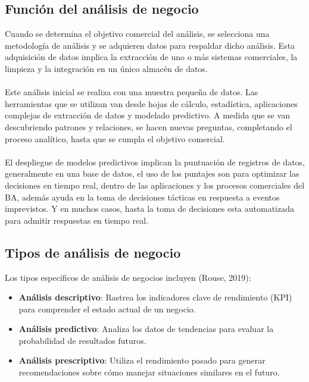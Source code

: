 \documentclass[twoside,twocolumn]{article}
\begin{document}
\subsection{Función del análisis de negocio}
Cuando se determina el objetivo comercial del análisis, se selecciona una metodología de análisis y se adquieren datos para respaldar dicho análisis.  Esta adquisición de datos implica la extracción de uno o más sistemas comerciales, la limpieza y la integración en un único almacén de datos.
\\ \\
Este análisis inicial se realiza con una muestra pequeña de datos.  Las herramientas que se utilizan van desde hojas de cálculo, estadística, aplicaciones complejas de extracción de datos y modelado predictivo. A medida que se van descubriendo patrones y relaciones, se hacen nuevas preguntas, completando el proceso analítico, hasta que se cumpla el objetivo comercial.
\\ \\
El despliegue de modelos predictivos implican la puntuación de registros de datos, generalmente en una base de datos, el uso de los puntajes son para optimizar las decisiones en tiempo real, dentro de las aplicaciones y los procesos comerciales del BA, además ayuda en la toma de decisiones tácticas en respuesta a eventos imprevistos.  Y en muchos casos, hasta la toma de decisiones esta automatizada para admitir respuestas en tiempo real.
\subsection{Tipos de análisis de negocio}
Los tipos específicos de análisis de negocios incluyen (Rouse, 2019):


\begin{itemize}	

	\item \textbf{Análisis descriptivo}: Rastrea los indicadores clave de rendimiento (KPI) para comprender el estado actual de un negocio.
	\item \textbf{Análisis predictivo}: Analiza los datos de tendencias para evaluar la probabilidad de resultados futuros.
	\item \textbf{Análisis prescriptivo}: Utiliza el rendimiento pasado para generar recomendaciones sobre cómo manejar situaciones similares en el futuro.

\end{itemize} 
\end{document}
